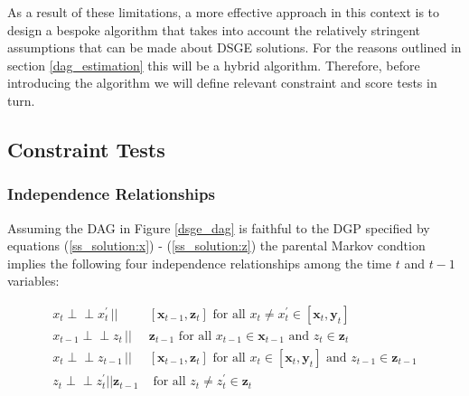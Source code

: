 \documentclass{article}
\def\indep{\perp \!\!\! \perp}
\begin{document}
As a result of these limitations, a more effective approach in this context is to design a bespoke algorithm that takes into account the relatively stringent assumptions that can be made about DSGE solutions. For the reasons outlined in section \ref{dag_estimation} this will be a hybrid algorithm. Therefore, before introducing the algorithm we will define relevant constraint and score tests in turn.

\subsection{Constraint Tests} \label{constrainttests}

\subsubsection{Independence Relationships}

Assuming the DAG in Figure \ref{dsge_dag} is faithful to the DGP specified by equations (\ref{ss_solution:x}) - (\ref{ss_solution:z}) the parental Markov condtion implies the following four independence relationships among the time $t$ and $t-1$ variables:

\begin{align}
  x_t \indep x^{\prime}_{t} \,||\,& [\mathbf{x}_{t-1},\mathbf{z}_t] \text{ for all } x_t \neq x^{\prime}_{t} \in [\mathbf{x}_t, \mathbf{y}_t] \label{constraint_test:1} \\
  x_{t-1} \indep z_{t} \,||\,& \mathbf{z}_{t-1} \text{ for all } x_{t-1} \in \mathbf{x}_{t-1} \text{ and } z_{t} \in \mathbf{z}_t \label{constraint_test:3} \\
  x_t \indep z_{t-1} \,||\,& [\mathbf{x}_{t-1}, \mathbf{z}_t] \text{ for all } x_t \in [\mathbf{x}_t, \mathbf{y}_t] \text{ and } z_{t-1} \in \mathbf{z}_{t-1} \label{constraint_test:2} \\
  z_t \indep z^{\prime}_{t} || \mathbf{z}_{t-1} & \text{ for all } z_t \not = z^{\prime}_{t} \in \mathbf{z}_t \label{constraint_test:4}
\end{align}
\end{document}
